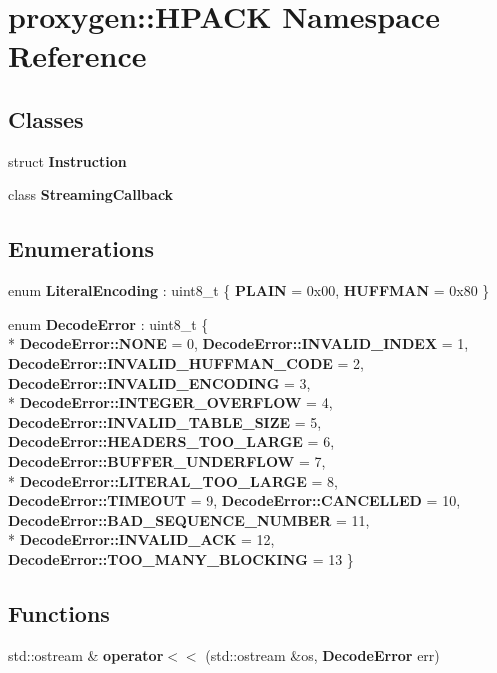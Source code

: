 \section{proxygen\+:\+:H\+P\+A\+CK Namespace Reference}
\label{namespaceproxygen_1_1HPACK}
\subsection*{Classes}
\begin{DoxyCompactItemize}
\item 
struct {\bf Instruction}
\item 
class {\bf Streaming\+Callback}
\end{DoxyCompactItemize}
\subsection*{Enumerations}
\begin{DoxyCompactItemize}
\item 
enum {\bf Literal\+Encoding} \+: uint8\+\_\+t \{ {\bf P\+L\+A\+IN} = 0x00, 
{\bf H\+U\+F\+F\+M\+AN} = 0x80
 \}
\item 
enum {\bf Decode\+Error} \+: uint8\+\_\+t \{ \\*
{\bf Decode\+Error\+::\+N\+O\+NE} = 0, 
{\bf Decode\+Error\+::\+I\+N\+V\+A\+L\+I\+D\+\_\+\+I\+N\+D\+EX} = 1, 
{\bf Decode\+Error\+::\+I\+N\+V\+A\+L\+I\+D\+\_\+\+H\+U\+F\+F\+M\+A\+N\+\_\+\+C\+O\+DE} = 2, 
{\bf Decode\+Error\+::\+I\+N\+V\+A\+L\+I\+D\+\_\+\+E\+N\+C\+O\+D\+I\+NG} = 3, 
\\*
{\bf Decode\+Error\+::\+I\+N\+T\+E\+G\+E\+R\+\_\+\+O\+V\+E\+R\+F\+L\+OW} = 4, 
{\bf Decode\+Error\+::\+I\+N\+V\+A\+L\+I\+D\+\_\+\+T\+A\+B\+L\+E\+\_\+\+S\+I\+ZE} = 5, 
{\bf Decode\+Error\+::\+H\+E\+A\+D\+E\+R\+S\+\_\+\+T\+O\+O\+\_\+\+L\+A\+R\+GE} = 6, 
{\bf Decode\+Error\+::\+B\+U\+F\+F\+E\+R\+\_\+\+U\+N\+D\+E\+R\+F\+L\+OW} = 7, 
\\*
{\bf Decode\+Error\+::\+L\+I\+T\+E\+R\+A\+L\+\_\+\+T\+O\+O\+\_\+\+L\+A\+R\+GE} = 8, 
{\bf Decode\+Error\+::\+T\+I\+M\+E\+O\+UT} = 9, 
{\bf Decode\+Error\+::\+C\+A\+N\+C\+E\+L\+L\+ED} = 10, 
{\bf Decode\+Error\+::\+B\+A\+D\+\_\+\+S\+E\+Q\+U\+E\+N\+C\+E\+\_\+\+N\+U\+M\+B\+ER} = 11, 
\\*
{\bf Decode\+Error\+::\+I\+N\+V\+A\+L\+I\+D\+\_\+\+A\+CK} = 12, 
{\bf Decode\+Error\+::\+T\+O\+O\+\_\+\+M\+A\+N\+Y\+\_\+\+B\+L\+O\+C\+K\+I\+NG} = 13
 \}
\end{DoxyCompactItemize}
\subsection*{Functions}
\begin{DoxyCompactItemize}
\item 
std\+::ostream \& {\bf operator$<$$<$} (std\+::ostream \&os, {\bf Decode\+Error} err)
\end{DoxyCompactItemize}
